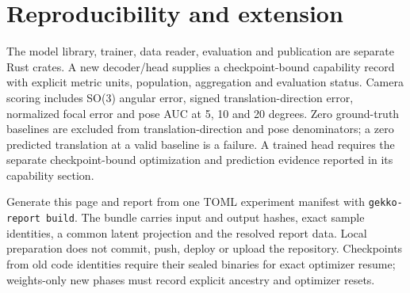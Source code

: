 \documentclass[10pt]{article}
\begin{document}
\section{Reproducibility and extension}
The model library, trainer, data reader, evaluation and publication are separate Rust crates. A new decoder/head supplies a checkpoint-bound capability record with explicit metric units, population, aggregation and evaluation status. Camera scoring includes SO(3) angular error, signed translation-direction error, normalized focal error and pose AUC at 5, 10 and 20 degrees. Zero ground-truth baselines are excluded from translation-direction and pose denominators; a zero predicted translation at a valid baseline is a failure. A trained head requires the separate checkpoint-bound optimization and prediction evidence reported in its capability section.

Generate this page and report from one TOML experiment manifest with \texttt{gekko-report build}. The bundle carries input and output hashes, exact sample identities, a common latent projection and the resolved report data. Local preparation does not commit, push, deploy or upload the repository. Checkpoints from old code identities require their sealed binaries for exact optimizer resume; weights-only new phases must record explicit ancestry and optimizer resets.
\end{document}
